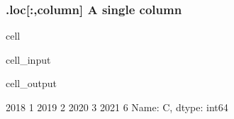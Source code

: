 \documentclass[letterpaper,10pt,english]{jupyterBook}
\begin{document}
\subsubsection{.loc{[}:,column{]} A single column}
\label{\detokenize{content/notebooks/pandas/dataframes:loc-column-a-single-column}}
\begin{sphinxuseclass}{cell}\begin{sphinxVerbatimInput}

\begin{sphinxuseclass}{cell_input}
\begin{sphinxVerbatim}[commandchars=\\\{\}]
\PYG{p}{[}\PYG{p}{]}
\end{sphinxVerbatim}

\end{sphinxuseclass}\end{sphinxVerbatimInput}
\begin{sphinxVerbatimOutput}

\begin{sphinxuseclass}{cell_output}
\begin{sphinxVerbatim}[commandchars=\\\{\}]
2018    1
2019    2
2020    3
2021    6
Name: C, dtype: int64
\end{sphinxVerbatim}

\end{sphinxuseclass}\end{sphinxVerbatimOutput}

\end{sphinxuseclass}
\end{document}
